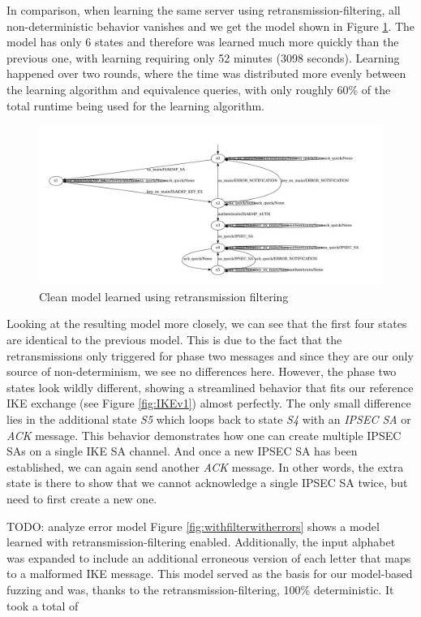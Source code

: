 In comparison, when learning the same server using retransmission-filtering, all non-deterministic behavior vanishes and we get the model shown in Figure \ref{fig:reference}. The model has only 6 states and therefore was learned much more quickly than the previous one, with learning requiring only 52 minutes (3098 seconds). Learning happened over two rounds, where the time was distributed more evenly between the learning algorithm and equivalence queries, with only roughly 60\% of the total runtime being used for the learning algorithm. 

\begin{figure}[h]
	\centering
	\includegraphics[width=\linewidth]{images/Reference}
	\caption{Clean model learned using retransmission filtering}
	\label{fig:reference}
\end{figure} 

Looking at the resulting model more closely, we can see that the first four states are identical to the previous model. This is due to the fact that the retransmissions only triggered for phase two messages and since they are our only source of non-determinism, we see no differences here. However, the phase two states look wildly different, showing a streamlined behavior that fits our reference IKE exchange (see Figure \ref{fig:IKEv1}) almost perfectly. The only small difference lies in the additional state \emph{S5} which loops back to state \emph{S4} with an \emph{IPSEC SA} or \emph{ACK} message. This behavior demonstrates how one can create multiple IPSEC SAs on a single IKE SA channel. And once a new IPSEC SA has been established, we can again send another \emph{ACK} message. In other words, the extra state is there to show that we cannot acknowledge a single IPSEC SA twice, but need to first create a new one.

TODO: analyze error model
Figure \ref{fig:withfilterwitherrors} shows a model learned with retransmission-filtering enabled. Additionally, the input alphabet was expanded to include an additional erroneous version of each letter that maps to a malformed IKE message. This model served as the basis for our model-based fuzzing and was, thanks to the retransmission-filtering, 100\% deterministic. It took a total of 

